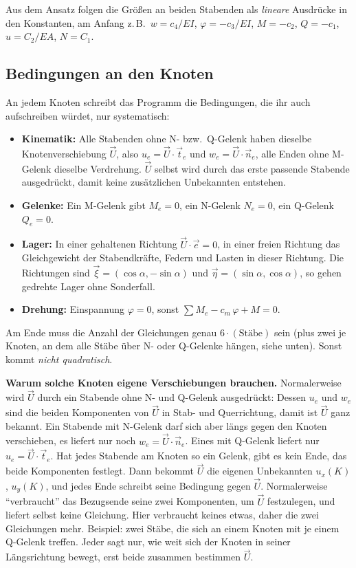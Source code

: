 Aus dem Ansatz folgen die Größen an beiden Stabenden als \emph{lineare} Ausdrücke in den
Konstanten, am Anfang z.\,B.\ $w = c_4/EI$, $\varphi = -c_3/EI$, $M = -c_2$, $Q = -c_1$,
$u = C_2/EA$, $N = C_1$.

\subsection{Bedingungen an den Knoten}

An jedem Knoten schreibt das Programm die Bedingungen, die ihr auch aufschreiben würdet, nur
systematisch:

\begin{itemize}
  \item \textbf{Kinematik:} Alle Stabenden ohne N- bzw.\ Q-Gelenk haben dieselbe
        Knotenverschiebung $\vec U$, also $u_e = \vec U\cdot\vec t_e$ und
        $w_e = \vec U\cdot\vec n_e$, alle Enden ohne M-Gelenk dieselbe Verdrehung. $\vec U$ selbst
        wird durch das erste passende Stabende ausgedrückt, damit keine zusätzlichen Unbekannten
        entstehen.
  \item \textbf{Gelenke:} Ein M-Gelenk gibt $M_e = 0$, ein N-Gelenk $N_e = 0$, ein Q-Gelenk
        $Q_e = 0$.
  \item \textbf{Lager:} In einer gehaltenen Richtung $\vec U\cdot\vec e = 0$, in einer freien
        Richtung das Gleichgewicht der Stabendkräfte, Federn und Lasten in dieser Richtung. Die
        Richtungen sind $\vec\xi = (\cos\alpha, -\sin\alpha)$ und $\vec\eta = (\sin\alpha, \cos\alpha)$,
        so gehen gedrehte Lager ohne Sonderfall.
  \item \textbf{Drehung:} Einspannung $\varphi = 0$, sonst $\sum M_e - c_m\,\varphi + M = 0$.
\end{itemize}

Am Ende muss die Anzahl der Gleichungen genau $6 \cdot (\text{Stäbe})$ sein (plus zwei je Knoten,
an dem alle Stäbe über N- oder Q-Gelenke hängen, siehe unten). Sonst kommt \emph{nicht quadratisch}.

\textbf{Warum solche Knoten eigene Verschiebungen brauchen.} Normalerweise wird $\vec U$ durch ein
Stabende ohne N- und Q-Gelenk ausgedrückt: Dessen $u_e$ und $w_e$ sind die beiden Komponenten von
$\vec U$ in Stab- und Querrichtung, damit ist $\vec U$ ganz bekannt. Ein Stabende mit N-Gelenk darf
sich aber längs gegen den Knoten verschieben, es liefert nur noch $w_e = \vec U\cdot\vec n_e$. Eines
mit Q-Gelenk liefert nur $u_e = \vec U\cdot\vec t_e$. Hat jedes Stabende am Knoten so ein Gelenk,
gibt es kein Ende, das beide Komponenten festlegt. Dann bekommt $\vec U$ die eigenen Unbekannten
$u_x(K)$, $u_y(K)$, und jedes Ende schreibt seine Bedingung gegen $\vec U$. Normalerweise
\enquote{verbraucht} das Bezugsende seine zwei Komponenten, um $\vec U$ festzulegen, und liefert
selbst keine Gleichung. Hier verbraucht keines etwas, daher die zwei Gleichungen mehr. Beispiel:
zwei Stäbe, die sich an einem Knoten mit je einem Q-Gelenk treffen. Jeder sagt nur, wie weit sich
der Knoten in seiner Längsrichtung bewegt, erst beide zusammen bestimmen $\vec U$.

